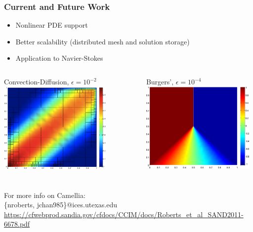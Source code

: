 \documentclass[mathserif]{beamer}
\begin{document}
\begin{frame}
\frametitle{Current and Future Work}
\begin{block}{}
\begin{itemize}
\item Nonlinear PDE support
\item Better scalability (distributed mesh and solution storage)
\item Application to Navier-Stokes
\end{itemize}
\end{block}

\begin{columns}[c]
\begin{column}{5.5cm}
\begin{block}{Convection-Diffusion, $\epsilon=10^{-2}$}
\includegraphics[width=5.5cm]{confusionDemo.png}
\end{block}
\end{column}
\begin{column}{5.5cm}
\begin{block}{Burgers', $\epsilon=10^{-4}$}
\includegraphics[width=5.5cm]{burgers1e4.png}
\end{block}
\end{column}
\end{columns}
\end{frame}


\begin{frame}
\frametitle{}
\begin{block}{}
For more info on Camellia:\\
\{nroberts, jchan985\}@ices.utexas.edu\\
\url{https://cfwebprod.sandia.gov/cfdocs/CCIM/docs/Roberts_et_al_SAND2011-6678.pdf}
\end{block}

\end{frame}

 
\end{document}
